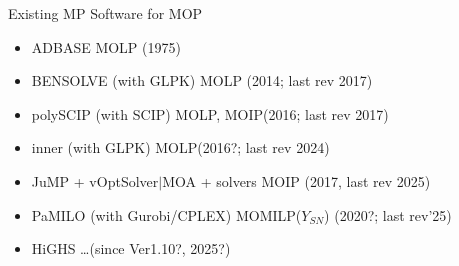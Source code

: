 \documentclass[]{beamer}
\begin{document}
\begin{frame}{Existing MP Software for MOP}

\small{
\begin{itemize}

\item ADBASE \hspace{32mm}MOLP \hfill (1975)\vspace{-1mm}\\
\pause
\item BENSOLVE (with GLPK) \hspace{10mm}MOLP \hfill (2014; last rev 2017)\vspace{-1mm}\\

\item polySCIP (with SCIP) \hspace{13.5mm} MOLP, MOIP\hfill (2016; last rev 2017)\vspace{-1mm}\\

\item inner (with GLPK) \hspace{18.5mm} MOLP\hfill (2016?; last rev 2024)\vspace{-1mm}\\

\item JuMP + vOptSolver$\mid$MOA + solvers \hspace{3mm} MOIP \hfill (2017, last rev 2025)\vspace{-1mm}\\

\item PaMILO (with Gurobi/CPLEX)  \hspace{2mm} MOMILP($Y_{SN}$) \hfill (2020?; last rev'25)\vspace{-1mm}\\
\pause

\item HiGHS \hspace{34.25mm} \dots  \hfill (since Ver1.10?, 2025?)\vspace{-1mm}\\

\end{itemize}




\vspace{3mm}

}
\end{frame}
\end{document}
